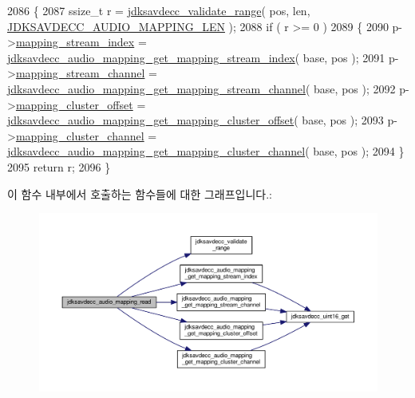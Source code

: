 \begin{DoxyCode}
2086 \{
2087     ssize\_t r = \hyperlink{group__util_ga9c02bdfe76c69163647c3196db7a73a1}{jdksavdecc\_validate\_range}( pos, len, 
      \hyperlink{group__audio__mapping_ga0dd006bf2320b99909db301f043f0cae}{JDKSAVDECC\_AUDIO\_MAPPING\_LEN} );
2088     \textcolor{keywordflow}{if} ( r >= 0 )
2089     \{
2090         p->\hyperlink{structjdksavdecc__audio__mapping_ae776f05f1f60f83a69c154844271ca4a}{mapping\_stream\_index} = 
      \hyperlink{group__audio__mapping_gad0cae65b8a99369e31936bb2814eba8d}{jdksavdecc\_audio\_mapping\_get\_mapping\_stream\_index}( base, 
      pos );
2091         p->\hyperlink{structjdksavdecc__audio__mapping_a82e8b562c8e2249f302ed80fc1debadf}{mapping\_stream\_channel} = 
      \hyperlink{group__audio__mapping_gada8d158ad24f15281af51fc7210af055}{jdksavdecc\_audio\_mapping\_get\_mapping\_stream\_channel}( 
      base, pos );
2092         p->\hyperlink{structjdksavdecc__audio__mapping_ab57e85d38dacb8e4e841cf9f1fbd7a36}{mapping\_cluster\_offset} = 
      \hyperlink{group__audio__mapping_gac2d9b5fab8b77bfaf402f489af76a243}{jdksavdecc\_audio\_mapping\_get\_mapping\_cluster\_offset}( 
      base, pos );
2093         p->\hyperlink{structjdksavdecc__audio__mapping_af42f86d0c0e308d654bb9519455c7e26}{mapping\_cluster\_channel} = 
      \hyperlink{group__audio__mapping_ga84394f6ee3d78cb732f62a698c25ca6d}{jdksavdecc\_audio\_mapping\_get\_mapping\_cluster\_channel}( 
      base, pos );
2094     \}
2095     \textcolor{keywordflow}{return} r;
2096 \}
\end{DoxyCode}


이 함수 내부에서 호출하는 함수들에 대한 그래프입니다.\+:
\nopagebreak
\begin{figure}[H]
\begin{center}
\leavevmode
\includegraphics[width=350pt]{group__audio__mapping_ga02ef1f9046bc3907adac826182928266_cgraph}
\end{center}
\end{figure}


